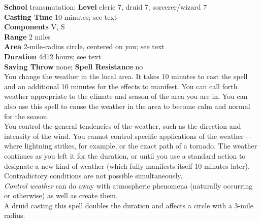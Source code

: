 \textbf{School} transmutation; \textbf{Level} cleric 7, druid 7, sorcerer/wizard 7\\
\textbf{Casting Time} 10 minutes; see text\\
\textbf{Components} V, S\\
\textbf{Range} 2 miles\\
\textbf{Area} 2-mile-radius circle, centered on you; see text\\
\textbf{Duration} 4d12 hours; see text\\
\textbf{Saving Throw} none; \textbf{Spell Resistance} no\\
You change the weather in the local area. It takes 10 minutes to cast the spell and an additional 10 minutes for the effects to manifest. You can call forth weather appropriate to the climate and season of the area you are in. You can also use this spell to cause the weather in the area to become calm and normal for the season.\\
You control the general tendencies of the weather, such as the direction and intensity of the wind. You cannot control specific applications of the weather—where lightning strikes, for example, or the exact path of a tornado. The weather continues as you left it for the duration, or until you use a standard action to designate a new kind of weather (which fully manifests itself 10 minutes later). Contradictory conditions are not possible simultaneously.\\
\textit{Control weather }can do away with atmospheric phenomena (naturally occurring or otherwise) as well as create them.\\
A druid casting this spell doubles the duration and affects a circle with a 3-mile radius.\\
